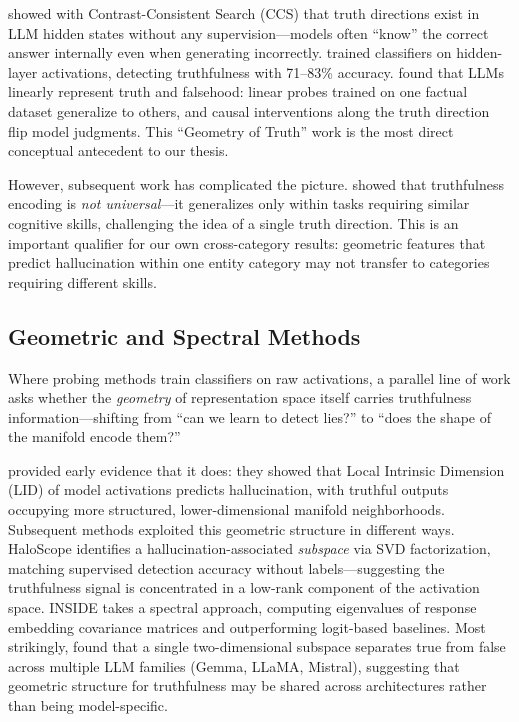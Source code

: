 \citet{burns2023discovering} showed with Contrast-Consistent Search (CCS) that truth directions exist in LLM hidden states without any supervision---models often ``know'' the correct answer internally even when generating incorrectly.  \citet{azaria2023internal} trained classifiers on hidden-layer activations, detecting truthfulness with 71--83\% accuracy.  \citet{marks2023geometry} found that LLMs linearly represent truth and falsehood: linear probes trained on one factual dataset generalize to others, and causal interventions along the truth direction flip model judgments.  This ``Geometry of Truth'' work is the most direct conceptual antecedent to our thesis.

However, subsequent work has complicated the picture.  \citet{orgad2025llms} showed that truthfulness encoding is \emph{not universal}---it generalizes only within tasks requiring similar cognitive skills, challenging the idea of a single truth direction.  This is an important qualifier for our own cross-category results: geometric features that predict hallucination within one entity category may not transfer to categories requiring different skills.

\subsection{Geometric and Spectral Methods}

Where probing methods train classifiers on raw activations, a parallel line of work asks whether the \emph{geometry} of representation space itself carries truthfulness information---shifting from ``can we learn to detect lies?'' to ``does the shape of the manifold encode them?''

\citet{singhal2024characterizing} provided early evidence that it does: they showed that Local Intrinsic Dimension (LID) of model activations predicts hallucination, with truthful outputs occupying more structured, lower-dimensional manifold neighborhoods.  Subsequent methods exploited this geometric structure in different ways.  HaloScope \citep{du2024haloscope} identifies a hallucination-associated \emph{subspace} via SVD factorization, matching supervised detection accuracy without labels---suggesting the truthfulness signal is concentrated in a low-rank component of the activation space.  INSIDE \citep{chen2024inside} takes a spectral approach, computing eigenvalues of response embedding covariance matrices and outperforming logit-based baselines.  Most strikingly, \citet{burger2024truth} found that a single two-dimensional subspace separates true from false across multiple LLM families (Gemma, LLaMA, Mistral), suggesting that geometric structure for truthfulness may be shared across architectures rather than being model-specific.

